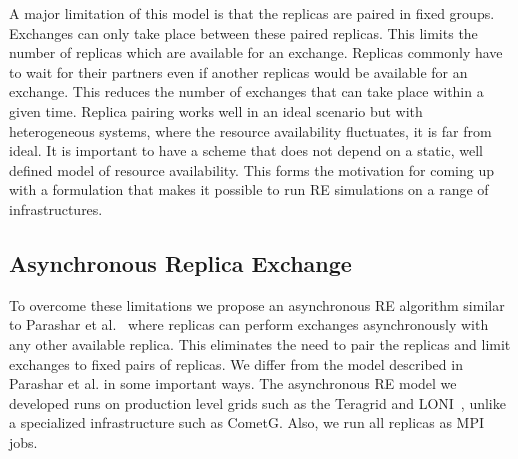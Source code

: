 \documentclass[a4paper,10pt]{article}
\newcommand{\jhanote}[1]{ {\textcolor{red} { ***shantenu: #1 }}}
\newcommand{\athotanote}[1]{ {\textcolor{green} { ***athota: #1 }}}
\newcommand{\jhanote}[1]{}
\newcommand{\athotanote}[1]{}
\begin{document}
A major limitation of this model is that the replicas are paired in fixed groups. 
Exchanges can only take place between these paired replicas.
This limits the number of replicas which are available for an exchange. 
Replicas commonly have to wait for their partners even if another replicas 
would be available for an exchange. %
This reduces the number of exchanges that can take place within a given time.
Replica pairing works well in an ideal scenario but with heterogeneous systems, 
where the resource availability fluctuates, it is far from ideal. It is 
important to have a scheme that does not depend on a static, well defined 
model of resource availability. This forms the motivation for coming up 
with a formulation that makes it possible to run RE simulations on a range of infrastructures.

  

  
\subsection{Asynchronous Replica Exchange}

To overcome these limitations we propose an asynchronous RE algorithm similar to Parashar et al.~\cite{parashar_arepex}
where replicas can perform exchanges asynchronously with any other available replica. This eliminates the need to pair the replicas and limit exchanges to fixed pairs of replicas. We differ from the model described in Parashar et al. in some important ways. The asynchronous RE model we developed runs on production level grids such as the Teragrid and LONI~\cite{LONI_web}, unlike a specialized infrastructure such as CometG. Also, we run all replicas as MPI jobs.
\end{document}
